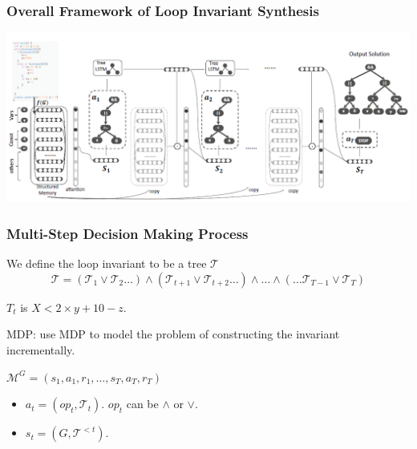 \documentclass[11pt]{beamer}
\begin{document}
\begin{frame}\frametitle{Overall Framework of Loop Invariant Synthesis}
\begin{center}
\includegraphics[scale = 0.39]{2.png}

\end{center}

\end{frame}
\begin{frame}\frametitle{Multi-Step Decision Making Process}
\begin{definition}
We define the loop invariant to be a tree $\mathcal{T}$
\[\mathcal{T} = (\mathcal{T}_1 \vee \mathcal{T}_2\ldots) \wedge (\mathcal{T}_{t+1} \vee \mathcal{T}_{t+2}\ldots)\wedge \ldots \wedge (\ldots\mathcal{T}_{T - 1} \vee \mathcal{T}_{T})\]
\end{definition}

$T_t$ is $X < 2\times y + 10 - z$.

MDP: use MDP to model the problem of constructing the invariant incrementally.

$\mathcal{M}^G = (s_1, a_1, r_1, \ldots, s_T, a_T, r_T)$
\begin{itemize}
\item $a_t = (op_t, \mathcal{T}_t)$. $op_t$ can be $\wedge $ or $\vee $.
\item $s_t = (G, \mathcal{T}^{ < t})$.

\end{itemize}

\end{frame}
\end{document}
